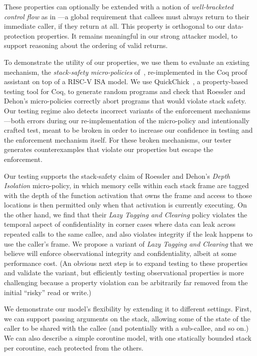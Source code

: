 \documentclass[acmtog,review,anonymous]{acmart}\settopmatter{printfolios=true,printccs=false,printacmref=false}
\begin{document}
These properties can optionally be extended with a notion of {\em well-bracketed control flow}
as in \citet{SkorstengaardSTK}---a global requirement that callees
must always return
to their immediate caller, if they return at all. This property is orthogonal to our
data-protection properties. It remains meaningful in our strong attacker model,
to support reasoning about the ordering of valid returns.

To demonstrate the utility of our properties, we use them
to evaluate an existing mechanism, the
{\em stack-safety micro-policies} of~\citet{DBLP:conf/sp/RoesslerD18}, re-implemented
in the Coq proof assistant on top of a RISC-V ISA model. We
use QuickChick~\citep{Denes:VSL2014,Pierce:SF4}, a property-based testing
tool for Coq, to generate random programs and check
that Roessler and Dehon's micro-policies correctly abort programs that
would violate stack safety.
Our testing regime also detects incorrect variants of the
enforcement mechanisms---both errors
during our re-implementation of the micro-policy and
intentionally crafted test, meant to be broken in order to increase our confidence
in testing and the enforcement mechanism itself. For these broken
mechanisms, our tester
generates counterexamples that violate our properties but escape the
enforcement.

Our testing supports the stack-safety claim of Roessler and Dehon's {\em Depth
  Isolation} micro-policy, in
which memory cells within each stack frame are tagged with the depth of
the function activation that owns the frame and access to those locations is
then permitted only when that activation is currently executing.
On the other hand, we find that their \emph{Lazy Tagging and Clearing} policy
violates the temporal aspect of confidentiality in
corner cases where data can leak across repeated calls to the same callee,
and also violates integrity if the leak happens to use the caller's frame. We
propose a variant of {\em Lazy Tagging and Clearing} that
  we believe will enforce observational
integrity and confidentiality, albeit at some performance cost. (An obvious next step
is to expand testing to these properties and validate the variant, but
efficiently
testing observational properties is more challenging because a property
violation can be arbitrarily far removed from the initial ``risky'' read or
write.)

We demonstrate our model's flexibility by extending it to different settings.
First, we can support passing arguments on the stack, allowing some of the state of
the caller to be shared with the callee (and potentially with a sub-callee,
and so on.)  We can also describe a simple coroutine model, with one
statically bounded stack per coroutine, each protected from the others.
\end{document}
